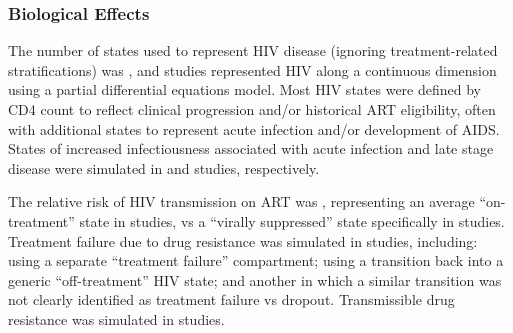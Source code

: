 \subsubsection{Biological Effects}
\label{sss:res:bio}
The \xdmdef number of states used to represent HIV disease
(ignoring treatment-related stratifications) was ,
and  studies represented HIV along a continuous dimension
using a partial differential equations model.
Most HIV states were defined by CD4 count %
to reflect clinical progression and/or historical ART eligibility,
often with additional states to represent acute infection and/or development of AIDS.
States of increased infectiousness associated with acute infection and late stage disease
were simulated in  and  studies, respectively.
\par
The relative risk of HIV transmission on ART was ,
representing an average ``on-treatment'' state in  studies,
vs a ``virally suppressed'' state specifically in  studies.
Treatment failure due to drug resistance was simulated in  studies, including:
 using a separate ``treatment failure'' compartment;
 using a transition back into a generic ``off-treatment'' HIV state; and another
 in which a similar transition  was not clearly identified as treatment failure vs dropout.
Transmissible drug resistance was simulated in  studies.
